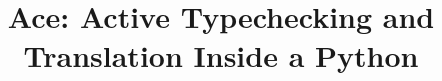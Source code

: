 \documentclass[10pt,preprint]{sigplanconf}
\begin{document}
\conferenceinfo{-}{-} 
\copyrightyear{-} 
\copyrightdata{[to be supplied]} 


\newcommand{\Ace}{\textsf{Ace}}

\title{\Ace: Active Typechecking and Translation Inside a Python}

\authorinfo{~}{~}{~}

\maketitle
\end{document}
